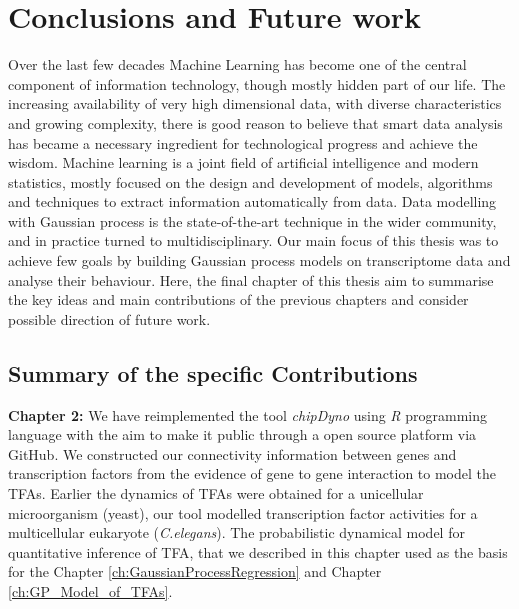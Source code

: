 
\chapter{Conclusions and Future work}

\ifpdf
    \graphicspath{{Chapter6/Figs/Raster/}{Chapter6/Figs/PDF/}{Chapter6/Figs/}}
\else
    \graphicspath{{Chapter6/Figs/Vector/}{Chapter6/Figs/}}
\fi

Over the last few decades Machine Learning has become one of the central component of information technology, though mostly hidden part of our life. The increasing availability of very high dimensional data, with diverse characteristics and growing complexity, there is good reason to believe that smart data analysis has became a necessary ingredient for technological progress and achieve the wisdom. Machine learning is a joint field of artificial intelligence and modern statistics, mostly focused on the design and development of models, algorithms and techniques to extract information automatically from data. Data modelling with Gaussian process is the state-of-the-art technique in the wider community, and in practice turned to multidisciplinary. Our main focus of this thesis was to achieve few goals by building Gaussian process models on transcriptome data and analyse their behaviour. Here, the final chapter of this thesis aim to summarise the key ideas and main contributions of the previous chapters and consider possible direction of future work.


\section{Summary of the specific Contributions}
\textbf{Chapter 2:} We have reimplemented the tool \emph{chipDyno} using \emph{R} programming language with the aim to make it public through a open source platform via GitHub. We constructed our connectivity information between genes and transcription factors from the evidence of gene to gene interaction to model the TFAs. Earlier the dynamics of TFAs were obtained for a unicellular microorganism (yeast), our tool modelled transcription factor activities for a multicellular eukaryote (\textit{C.elegans}). The probabilistic dynamical model for quantitative inference of TFA, that we described in this chapter used as the basis for the  Chapter \ref{ch:GaussianProcessRegression} and Chapter \ref{ch:GP_Model_of_TFAs}.

